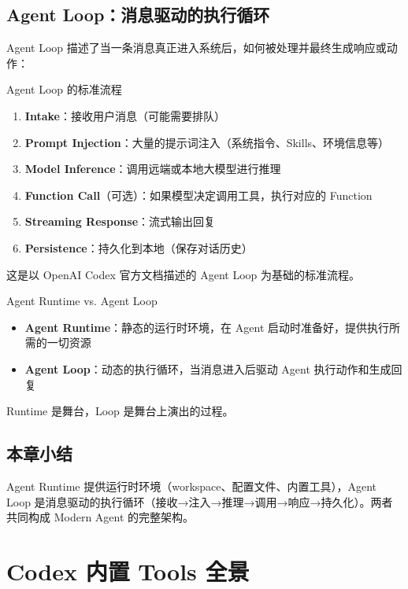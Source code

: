 \documentclass[a4paper]{article}
\begin{document}
\subsection{Agent Loop：消息驱动的执行循环}

Agent Loop 描述了当一条消息真正进入系统后，如何被处理并最终生成响应或动作：

\begin{importantbox}{Agent Loop 的标准流程}
\begin{enumerate}
    \item \textbf{Intake}：接收用户消息（可能需要排队）
    \item \textbf{Prompt Injection}：大量的提示词注入（系统指令、Skills、环境信息等）
    \item \textbf{Model Inference}：调用远端或本地大模型进行推理
    \item \textbf{Function Call}（可选）：如果模型决定调用工具，执行对应的 Function
    \item \textbf{Streaming Response}：流式输出回复
    \item \textbf{Persistence}：持久化到本地（保存对话历史）
\end{enumerate}
这是以 OpenAI Codex 官方文档描述的 Agent Loop 为基础的标准流程。
\end{importantbox}

\begin{knowledgebox}{Agent Runtime vs. Agent Loop}
\begin{itemize}
    \item \textbf{Agent Runtime}：静态的运行时环境，在 Agent 启动时准备好，提供执行所需的一切资源
    \item \textbf{Agent Loop}：动态的执行循环，当消息进入后驱动 Agent 执行动作和生成回复
\end{itemize}
Runtime 是舞台，Loop 是舞台上演出的过程。
\end{knowledgebox}

\subsection{本章小结}

Agent Runtime 提供运行时环境（workspace、配置文件、内置工具），Agent Loop 是消息驱动的执行循环（接收→注入→推理→调用→响应→持久化）。两者共同构成 Modern Agent 的完整架构。


\section{Codex 内置 Tools 全景}
\end{document}
